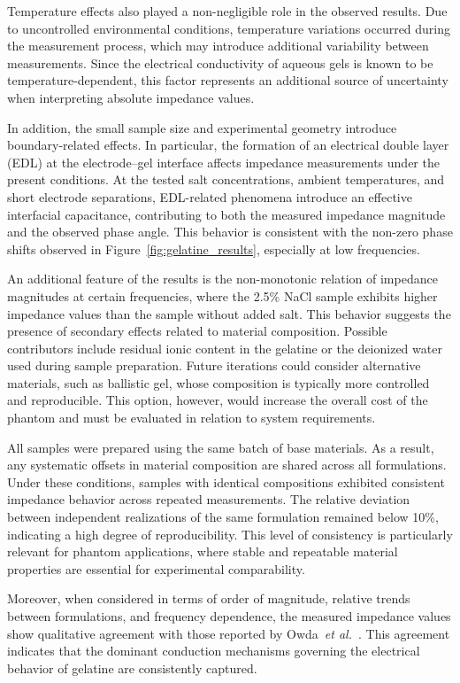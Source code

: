 \documentclass[../00_Main.tex]{subfiles}
\begin{document}
Temperature effects also played a non-negligible role in the observed results.
Due to uncontrolled environmental conditions, temperature variations occurred during the
measurement process, which may introduce additional variability between measurements.
Since the electrical conductivity of aqueous gels is known to be temperature-dependent,
this factor represents an additional source of uncertainty when interpreting absolute
impedance values.

In addition, the small sample size and experimental geometry introduce boundary-related
effects.
In particular, the formation of an electrical double layer (EDL) at the electrode--gel
interface affects impedance measurements under the present conditions.
At the tested salt concentrations, ambient temperatures, and short electrode separations,
EDL-related phenomena introduce an effective interfacial capacitance, contributing to both
the measured impedance magnitude and the observed phase angle.
This behavior is consistent with the non-zero phase shifts observed in
Figure~\ref{fig:gelatine_results}, especially at low frequencies.

An additional feature of the results is the non-monotonic relation of impedance magnitudes
at certain frequencies, where the 2.5\% NaCl sample exhibits higher impedance values than the
sample without added salt.
This behavior suggests the presence of secondary effects related to material composition.
Possible contributors include residual ionic content in the gelatine or the deionized water
used during sample preparation.
Future iterations could consider alternative materials, such as ballistic gel, whose
composition is typically more controlled and reproducible.
This option, however, would increase the overall cost of the phantom and must be evaluated
in relation to system requirements.

All samples were prepared using the same batch of base materials.
As a result, any systematic offsets in material composition are shared across all
formulations.
Under these conditions, samples with identical compositions exhibited consistent impedance
behavior across repeated measurements.
The relative deviation between independent realizations of the same formulation remained
below 10\%, indicating a high degree of reproducibility.
This level of consistency is particularly relevant for phantom applications, where stable
and repeatable material properties are essential for experimental comparability.

Moreover, when considered in terms of order of magnitude, relative trends between
formulations, and frequency dependence, the measured impedance values show qualitative
agreement with those reported by Owda~\emph{et al.}~\cite{Owda2020}.
This agreement indicates that the dominant conduction mechanisms governing the electrical
behavior of gelatine are consistently captured.
\end{document}
